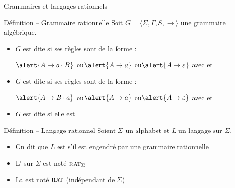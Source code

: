 
\begingroup

\begin{frame}{Grammaires et langages rationnels}

  \vspace{-2mm}
  \begin{block}{Définition -- Grammaire rationnelle}
    Soit \alert{$G = \langle \Sigma, \Gamma, S, \rightarrow \rangle$} une grammaire algébrique. 
    \begin{itemize}
    \item $G$ est dite  si ses règles sont de la forme :
      \begin{center}
        $\alert{A \rightarrow a \cdot B}$ \quad ou\quad $\alert{A \rightarrow a}$ \quad ou\quad $\alert{A \rightarrow \varepsilon}$
        \quad avec  et 
      \end{center}
    \item $G$ est dite  si ses règles sont de la forme :
      \begin{center}
        $\alert{A \rightarrow B \cdot a}$ \quad ou\quad $\alert{A \rightarrow a}$ \quad ou\quad $\alert{A \rightarrow \varepsilon}$
        \quad avec  et 
      \end{center}
    \item $G$ est dite  si elle est 
    \end{itemize}
  \end{block}

  \vspace{-1mm}
  \begin{block}{Définition -- Langage rationnel}
    \vspace{-1mm}
    Soient $\Sigma$ un alphabet et $L$ un langage sur $\Sigma$.
    \begin{itemize}
    \item On dit que $L$ est  s'il est engendré par une grammaire rationnelle
    \item L' sur $\Sigma$ est noté \alert{$\textsc{rat}_\Sigma$}
    \item La  est noté \alert{$\textsc{rat}$} (indépendant de $\Sigma$)
    \end{itemize}
  \end{block}


\end{frame}

